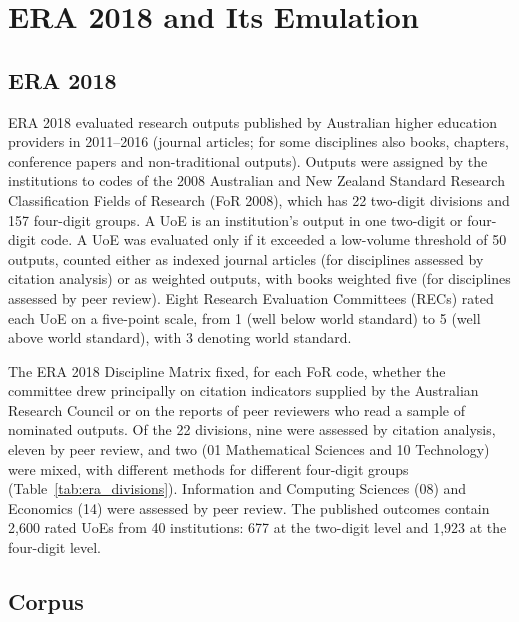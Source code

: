 \section{ERA 2018 and Its Emulation}
\label{sec:data}

\subsection{ERA 2018}

ERA 2018 evaluated research outputs published by Australian higher education providers in 2011--2016 (journal articles; for some disciplines also books, chapters, conference papers and non-traditional outputs). Outputs were assigned by the institutions to codes of the 2008 Australian and New Zealand Standard Research Classification Fields of Research (FoR 2008), which has 22 two-digit divisions and 157 four-digit groups. A UoE is an institution's output in one two-digit or four-digit code. A UoE was evaluated only if it exceeded a low-volume threshold of 50 outputs, counted either as indexed journal articles (for disciplines assessed by citation analysis) or as weighted outputs, with books weighted five (for disciplines assessed by peer review). Eight Research Evaluation Committees (RECs) rated each UoE on a five-point scale, from 1 (well below world standard) to 5 (well above world standard), with 3 denoting world standard.

The ERA 2018 Discipline Matrix fixed, for each FoR code, whether the committee drew principally on citation indicators supplied by the Australian Research Council or on the reports of peer reviewers who read a sample of nominated outputs. Of the 22 divisions, nine were assessed by citation analysis, eleven by peer review, and two (01 Mathematical Sciences and 10 Technology) were mixed, with different methods for different four-digit groups (Table~\ref{tab:era_divisions}). Information and Computing Sciences (08) and Economics (14) were assessed by peer review. The published outcomes contain 2,600 rated UoEs from 40 institutions: 677 at the two-digit level and 1,923 at the four-digit level.

\subsection{Corpus}

